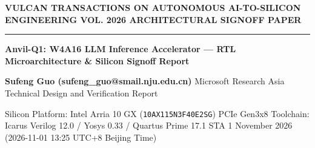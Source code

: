 \documentclass[11pt,a4paper]{article}
\begin{document}
{\scriptsize\sffamily\textcolor{vulcan}{\textbf{VULCAN TRANSACTIONS ON AUTONOMOUS AI-TO-SILICON ENGINEERING \hfill VOL. 2026 \textperiodcentered{} ARCHITECTURAL SIGNOFF PAPER}}\par}

\vspace{1pt}\textcolor{vulcan}{\rule{\textwidth}{1.2pt}}\vspace{4pt}

\begin{center}

{\sffamily\LARGE\bfseries Anvil-Q1: W4A16 LLM Inference Accelerator — RTL Microarchitecture \& Silicon Signoff Report\par}\vspace{3pt}

{\small\sffamily\textbf{Sufeng Guo (\allowbreak{}sufeng\_\allowbreak{}guo@smail.nju.edu.cn)\allowbreak{}} \textperiodcentered{} Microsoft Research Asia \textperiodcentered{} Technical Design and Verification Report\par}\vspace{1pt}

{\scriptsize\sffamily\textcolor{black!75}{Silicon Platform: Intel Arria 10 GX (\texttt{10AX115N3F40E2SG}) PCIe Gen3x8 \textperiodcentered{} Toolchain: Icarus Verilog 12.0 / Yosys 0.33 / Quartus Prime 17.1 STA \textperiodcentered{} 1 November 2026 (\allowbreak{}2026-11-01 13:25 UTC+\allowbreak{}8 Beijing Time)\allowbreak{}}\par}

\end{center}\vspace{2pt}
\end{document}
